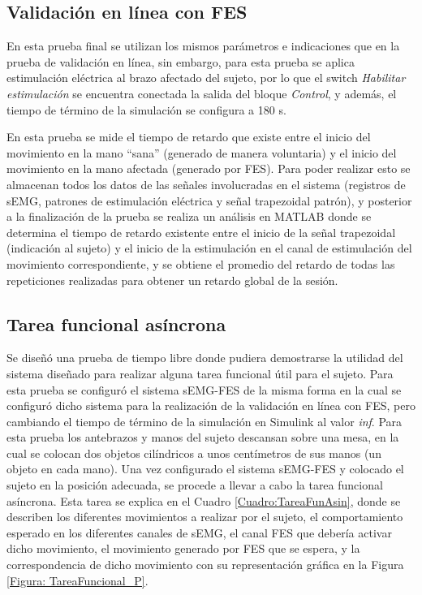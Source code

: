\newpage
\subsection{Validación en línea con FES}\label{Sec: TareaObj}
En esta prueba final se utilizan los mismos parámetros e indicaciones que en la prueba de validación en línea, sin embargo, para esta prueba se aplica estimulación eléctrica al brazo afectado del sujeto, por lo que el switch \emph{Habilitar estimulación} se encuentra conectada la salida del bloque \emph{Control}, y además, el tiempo de término de la simulación se configura a 180 s.

En esta prueba se mide el tiempo de retardo que existe entre el inicio del movimiento en la mano ``sana'' (generado de manera voluntaria) y el inicio del movimiento en la mano afectada (generado por FES). Para poder realizar esto se almacenan todos los datos de las señales involucradas en el sistema (registros de sEMG, patrones de estimulación eléctrica y señal trapezoidal patrón), y posterior a la finalización de la prueba se realiza un análisis en MATLAB\textregistered \; donde se determina el tiempo de retardo existente entre el inicio de la señal trapezoidal (indicación al sujeto) y el inicio de la estimulación en el canal de estimulación del movimiento correspondiente, y se obtiene el promedio del retardo de todas las repeticiones realizadas para obtener un retardo global de la sesión.

\subsection{Tarea funcional asíncrona}\label{Sec: TareaFunAsin}
Se diseñó una prueba de tiempo libre donde pudiera demostrarse la utilidad del sistema diseñado para realizar alguna tarea funcional útil para el sujeto. Para esta prueba se configuró el sistema sEMG-FES de la misma forma en la cual se configuró dicho sistema para la realización de la validación en línea con FES, pero cambiando el tiempo de término de la simulación en Simulink \textregistered\; al valor \emph{inf}. Para esta prueba los antebrazos y manos del sujeto descansan sobre una mesa, en la cual se colocan dos objetos cilíndricos a unos centímetros de sus manos (un objeto en cada mano). Una vez configurado el sistema sEMG-FES y colocado el sujeto en la posición adecuada, se procede a llevar a cabo la tarea funcional asíncrona. Esta tarea se explica en el Cuadro \ref{Cuadro:TareaFunAsin}, donde se describen los diferentes movimientos a realizar por el sujeto, el comportamiento esperado en los diferentes canales de sEMG, el canal FES que debería activar dicho movimiento, el movimiento generado por FES que se espera, y la correspondencia de dicho movimiento con su representación gráfica en la Figura \ref{Figura: TareaFuncional_P}.

